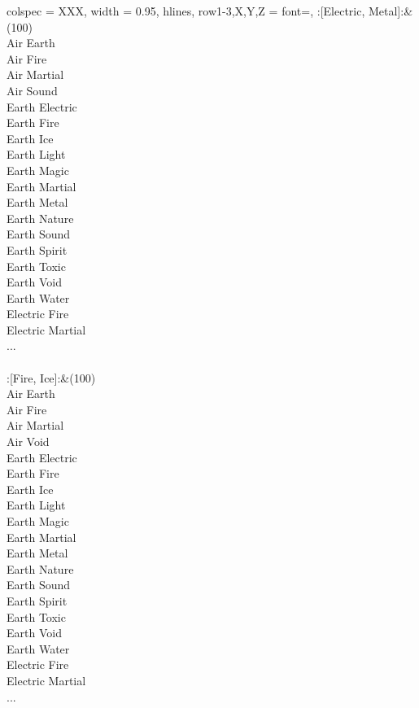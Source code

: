 \begin{longtblr}[
	caption = {2v2 Defending Weak},
	label = {2v2-Defending-Weak},
]{
	colspec = {XXX}, width = 0.95\linewidth,
	hlines,
	row{1-3,X,Y,Z} = {font=\bfseries},
}
	:[Electric, Metal]:&{(100)\\
	Air Earth \\
	Air Fire \\
	Air Martial \\
	Air Sound \\
	Earth Electric \\
	Earth Fire \\
	Earth Ice \\
	Earth Light \\
	Earth Magic \\
	Earth Martial \\
	Earth Metal \\
	Earth Nature \\
	Earth Sound \\
	Earth Spirit \\
	Earth Toxic \\
	Earth Void \\
	Earth Water \\
	Electric Fire \\
	Electric Martial \\
	...\\
	}\\

	:[Fire, Ice]:&{(100)\\
	Air Earth \\
	Air Fire \\
	Air Martial \\
	Air Void \\
	Earth Electric \\
	Earth Fire \\
	Earth Ice \\
	Earth Light \\
	Earth Magic \\
	Earth Martial \\
	Earth Metal \\
	Earth Nature \\
	Earth Sound \\
	Earth Spirit \\
	Earth Toxic \\
	Earth Void \\
	Earth Water \\
	Electric Fire \\
	Electric Martial \\
	...\\
	}\\


\end{longtblr}
